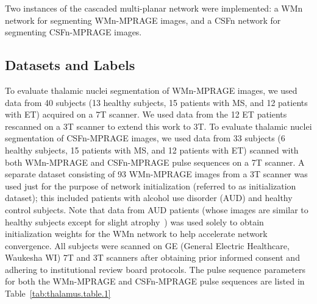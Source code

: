 Two instances of the cascaded multi-planar network were implemented: a WMn network for segmenting WMn-MPRAGE images, and a CSFn network for segmenting CSFn-MPRAGE images.

\subsection{Datasets and Labels}
To evaluate thalamic nuclei segmentation of WMn-MPRAGE images, we used data from 40 subjects (13 healthy subjects, 15 patients with MS, and 12 patients with ET) acquired on a 7T scanner. We used data from the 12 ET patients rescanned on a 3T scanner to extend this work to 3T. To evaluate thalamic nuclei segmentation of CSFn-MPRAGE images, we used data from 33 subjects (6 healthy subjects, 15 patients with MS, and 12 patients with ET) scanned with both WMn-MPRAGE and CSFn-MPRAGE pulse sequences on a 7T scanner. A separate dataset consisting of 93 WMn-MPRAGE images from a 3T scanner was used just for the purpose of network initialization (referred to as initialization dataset); this included patients with alcohol use disorder (AUD) and healthy control subjects. Note that data from AUD patients (whose images are similar to healthy subjects except for slight atrophy~\cite{zahr_Sensitivity_2020}) was used solely to obtain initialization weights for the WMn network to help accelerate network convergence. All subjects were scanned on GE (General Electric Healthcare, Waukesha WI) 7T and 3T scanners after obtaining prior informed consent and adhering to institutional review board protocols. The pulse sequence parameters for both the WMn-MPRAGE and CSFn-MPRAGE pulse sequences are listed in Table~\ref{tab:thalamus.table.1}

